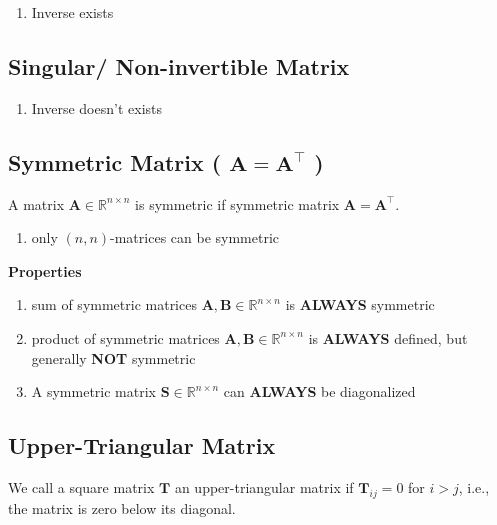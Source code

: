 \begin{enumerate}
    \item Inverse exists
\end{enumerate}


\subsection{Singular/ Non-invertible Matrix \cite{mfml-1}}\label{Singular/ Non-invertible Matrix}

\begin{enumerate}
    \item Inverse doesn’t exists
\end{enumerate}


\subsection{Symmetric Matrix ( $\mathbf{A = A^\top}$ ) \cite{mfml-1}}\label{Symmetric Matrix}
A matrix $\mathbf{A} \in \mathbb{R}^{n\times n}$ is symmetric if symmetric matrix $\mathbf{A = A^\top}$.

\begin{enumerate}
    \item only $(n, n)$-matrices can be symmetric
\end{enumerate}

\textbf{Properties}
\begin{enumerate}
    \item sum of symmetric matrices $\mathbf{A, B} \in \mathbb{R}^{n\times n}$ is \textbf{ALWAYS} symmetric

    \item product of symmetric matrices $\mathbf{A, B} \in \mathbb{R}^{n\times n}$ is \textbf{ALWAYS} defined, but generally \textbf{NOT} symmetric

    \item A symmetric matrix $\mathbf{S} \in \mathbb{R}^{n\times n}$ can \textbf{ALWAYS} be diagonalized
\end{enumerate}


\subsection{Upper-Triangular Matrix \cite{mfml-1}}\label{Upper-Triangular Matrix}
We call a square matrix $\mathbf{T}$ an upper-triangular matrix if $\mathbf{T}_{ij} = 0$ for $i > j$, i.e., the matrix is zero below its diagonal.

